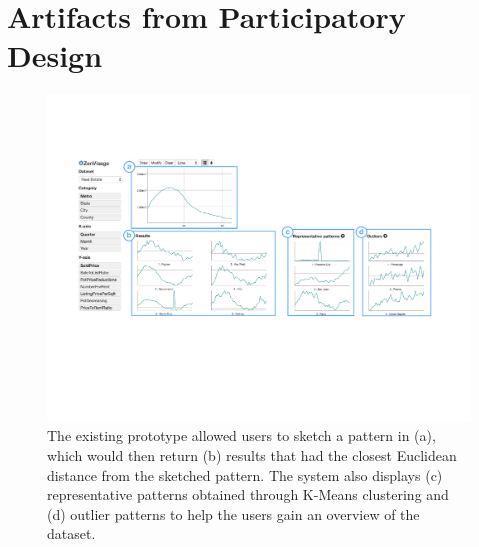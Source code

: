\appendix
\section{Artifacts from Participatory Design\label{apdx:pdartifact}}
\begin{figure}[h!]
	\centering
	\includegraphics[width=\linewidth]{figures/oldZV_nozql.pdf}
	\caption{The existing \zv prototype allowed users to sketch a pattern in (a), which would then return (b) results that had the closest Euclidean distance from the sketched pattern. The system also displays (c) representative patterns obtained through K-Means clustering and (d) outlier patterns to help the users gain an overview of the dataset.}
	\label{oldZV}
\end{figure}
